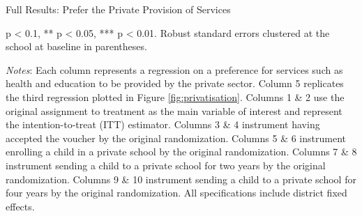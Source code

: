 \documentclass[hidelinks, 12pt, titlepage]{article}
\begin{document}
\begin{landscape}
				\clearpage

				\begin{table}
					\begin{threeparttable}
						\centering
						\caption{Full Results: Prefer the Private Provision of Services\label{table:appendixprivateserviceprovision}}
						
						\begin{tablenotes}
							\item * p < 0.1, ** p < 0.05, *** p < 0.01. Robust standard errors clustered at the school at baseline in parentheses.
							\item \emph{Notes}: Each column represents a regression on a preference for services such as health and education to be provided by the private sector.  Column 5 replicates the third regression plotted in Figure \ref{fig:privatisation}.  Columns 1 \& 2 use the original assignment to treatment as the main variable of interest and represent the intention-to-treat (ITT) estimator.  Columns 3 \& 4 instrument having accepted the voucher by the original randomization.  Columns 5 \& 6 instrument enrolling a child in a private school by the original randomization.  Columns 7 \& 8 instrument sending a child to a private school for two years by the original randomization.  Columns 9 \& 10 instrument sending a child to a private school for four years by the original randomization.  All specifications include district fixed effects.
						\end{tablenotes}
					\end{threeparttable}
				\end{table}
				\clearpage


\end{landscape}
\end{document}
